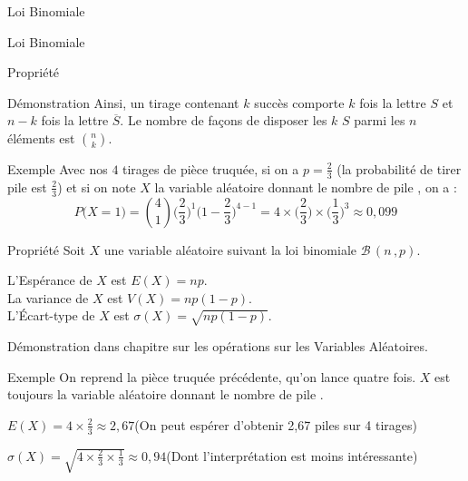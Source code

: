 \documentclass{cours}
\begin{document}
\begin{Gpartie}{Loi Binomiale}
\begin{Spartie}{Loi Binomiale}
\begin{SSpartie}{Propriété}
\begin{SSSpartie}{Démonstration}
                    Ainsi, un tirage contenant $k$ succès comporte $k$ fois la lettre $S$ et $n-k$ fois la lettre $\overline{S}$. Le nombre de façons de disposer les $k$ \og $S$ \fg{} parmi les $n$ éléments est $\binom{n}{k}$.
                \end{SSSpartie}
                \begin{SSSpartie}{Exemple} 
                    Avec nos $4$ tirages de pièce truquée, si on a $p=\frac{2}{3}$ (la probabilité de tirer \og pile \fg{} est $\frac{2}{3}$) et si on note $X$ la variable aléatoire donnant le nombre de \og pile \fg{}, on a :
                    \[P\big(X=1\big)=\binom{4}{1}\Bigg(\frac{2}{3}\Bigg)^1\Bigg(1-\frac{2}{3}\Bigg)^{4-1}=4\times\Bigg(\frac{2}{3}\Bigg)\times\Bigg(\frac{1}{3}\Bigg)^3\approx 0{,}099\]
                \end{SSSpartie}
            \end{SSpartie}
            \begin{SSpartie}{Propriété} 
                Soit $X$ une variable aléatoire suivant la loi binomiale $\mathcal{B}\,\left(n\,, p\right)$.

                L'Espérance de $X$ est $\boxed{E(X)=np}$. \\ La variance de $X$ est $\boxed{V(X)=np(1-p)}$. \\ L'Écart-type de $X$ est $\boxed{\sigma(X)=\sqrt{np(1-p)}}$.

                Démonstration dans chapitre sur les opérations sur les Variables Aléatoires.
                \begin{SSSpartie}{Exemple} 
                    On reprend la pièce truquée précédente, qu'on lance quatre fois. $X$ est toujours la variable aléatoire donnant le nombre de \og pile \fg.

                    $E(X)=4\times\frac{2}{3}\approx 2{,}67$\quad (On peut espérer d'obtenir 2{,}67 piles sur 4 tirages)

                    $\sigma(X)=\sqrt{4\times\frac{2}{3}\times\frac{1}{3}}\approx 0{,}94$\quad (Dont l'interprétation est moins intéressante)
                \end{SSSpartie}
            \end{SSpartie}
        \end{Spartie}
    \end{Gpartie}
\end{document}
